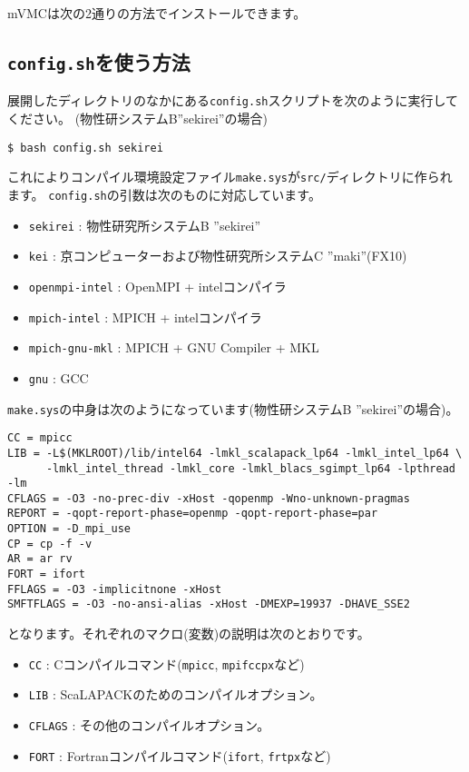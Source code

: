 mVMCは次の2通りの方法でインストールできます。

\subsection{\texttt{config.sh}を使う方法}

展開したディレクトリのなかにある\verb|config.sh|スクリプトを次のように実行してください。
(物性研システムB''sekirei''の場合)
\begin{verbatim}
$ bash config.sh sekirei
\end{verbatim}
これによりコンパイル環境設定ファイル\verb|make.sys|が\verb|src/|ディレクトリに作られます。
\verb|config.sh|の引数は次のものに対応しています。
\begin{itemize}
\item \verb|sekirei| : 物性研究所システムB ''sekirei''
\item \verb|kei| : 京コンピューターおよび物性研究所システムC ''maki''(FX10)
\item \verb|openmpi-intel| : OpenMPI + intelコンパイラ
\item \verb|mpich-intel| : MPICH + intelコンパイラ
\item \verb|mpich-gnu-mkl| : MPICH + GNU Compiler + MKL
\item \verb|gnu| : GCC
\end{itemize}

\verb|make.sys|の中身は次のようになっています(物性研システムB ''sekirei''の場合)。
\begin{verbatim}
CC = mpicc
LIB = -L$(MKLROOT)/lib/intel64 -lmkl_scalapack_lp64 -lmkl_intel_lp64 \
      -lmkl_intel_thread -lmkl_core -lmkl_blacs_sgimpt_lp64 -lpthread -lm
CFLAGS = -O3 -no-prec-div -xHost -qopenmp -Wno-unknown-pragmas
REPORT = -qopt-report-phase=openmp -qopt-report-phase=par
OPTION = -D_mpi_use
CP = cp -f -v
AR = ar rv
FORT = ifort
FFLAGS = -O3 -implicitnone -xHost
SMFTFLAGS = -O3 -no-ansi-alias -xHost -DMEXP=19937 -DHAVE_SSE2
\end{verbatim}
となります。それぞれのマクロ(変数)の説明は次のとおりです。
\begin{itemize}
\item \verb|CC| : Cコンパイルコマンド(\verb|mpicc|, \verb|mpifccpx|など)
\item \verb|LIB| : ScaLAPACKのためのコンパイルオプション。
\item \verb|CFLAGS| : その他のコンパイルオプション。
\item \verb|FORT| : Fortranコンパイルコマンド(\verb|ifort|, \verb|frtpx|など)
\end{itemize}


